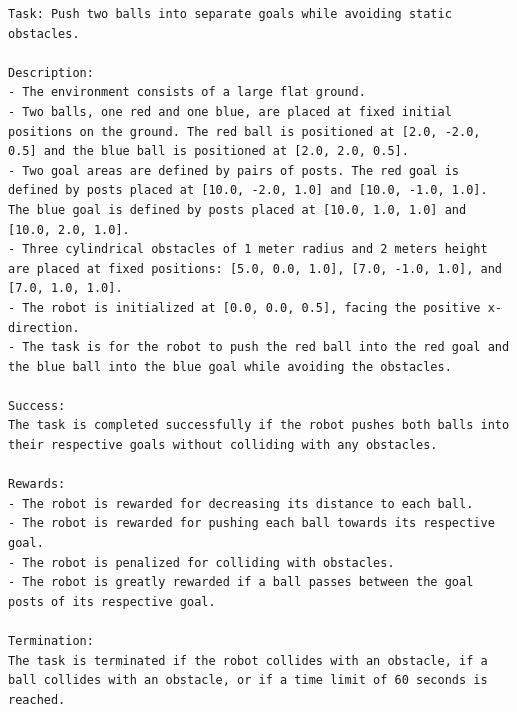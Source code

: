 \begin{lstlisting}[language={}]
Task: Push two balls into separate goals while avoiding static obstacles.

Description:
- The environment consists of a large flat ground.
- Two balls, one red and one blue, are placed at fixed initial positions on the ground. The red ball is positioned at [2.0, -2.0, 0.5] and the blue ball is positioned at [2.0, 2.0, 0.5].
- Two goal areas are defined by pairs of posts. The red goal is defined by posts placed at [10.0, -2.0, 1.0] and [10.0, -1.0, 1.0]. The blue goal is defined by posts placed at [10.0, 1.0, 1.0] and [10.0, 2.0, 1.0].
- Three cylindrical obstacles of 1 meter radius and 2 meters height are placed at fixed positions: [5.0, 0.0, 1.0], [7.0, -1.0, 1.0], and [7.0, 1.0, 1.0].
- The robot is initialized at [0.0, 0.0, 0.5], facing the positive x-direction.
- The task is for the robot to push the red ball into the red goal and the blue ball into the blue goal while avoiding the obstacles.

Success:
The task is completed successfully if the robot pushes both balls into their respective goals without colliding with any obstacles.

Rewards:
- The robot is rewarded for decreasing its distance to each ball.
- The robot is rewarded for pushing each ball towards its respective goal.
- The robot is penalized for colliding with obstacles.
- The robot is greatly rewarded if a ball passes between the goal posts of its respective goal.

Termination:
The task is terminated if the robot collides with an obstacle, if a ball collides with an obstacle, or if a time limit of 60 seconds is reached.
\end{lstlisting}
